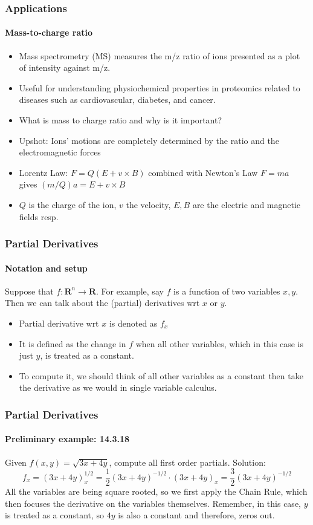 \documentclass[xcolor=svgnames]{beamer}
\begin{document}
\begin{frame}
\frametitle{Applications}
\framesubtitle{Mass-to-charge ratio}
\begin{itemize}
\item Mass spectrometry (MS) measures the m/z ratio of ions presented as a plot of intensity against m/z. 
\item Useful for understanding physiochemical properties in proteomics related to diseases such as cardiovascular, diabetes, and cancer. 
\item What is mass to charge ratio and why is it important?
\item Upshot: Ions' motions are completely determined by the ratio and the electromagnetic forces
\item Lorentz Law: $F = Q(E + v \times B)$ combined with Newton's Law $F = ma$ gives $(m/Q)a = E + v \times B$
\item $Q$ is the charge of the ion, $v$ the velocity, $E,B$ are the electric and magnetic fields resp.
\end{itemize}
\end{frame}
\begin{frame}
\frametitle{Partial Derivatives}
\framesubtitle{Notation and setup}
Suppose that $f: \mathbf{R}^n \to \mathbf{R}$. For example, say $f$ is a function of two variables $x,y$. Then we can talk about the (partial) derivatives wrt $x$ or $y$. 

\begin{itemize}
\item Partial derivative wrt $x$ is denoted as $f_x$
\item It is defined as the change in $f$ when all other variables, which in this case is just $y$, is treated as a constant. 
\item To compute it, we should think of all other variables as a constant then take the derivative as we would in single variable calculus. 

\end{itemize}


\end{frame}
\begin{frame}
\frametitle{Partial Derivatives}
\framesubtitle{Preliminary example: 14.3.18}
Given $f(x,y) = \sqrt{3x + 4y}$, compute all first order partials. 
Solution: 
\[
f_x = (3x + 4y)^{1/2} _ x = \frac{1}{2} (3x + 4y)^{-1/2} \cdot (3x + 4y) _x = \frac{3}{2} (3x + 4y)^{-1/2}
\]
All the variables are being square rooted, so we first apply the Chain Rule, which then focuses the derivative on the variables themselves. Remember, in this case, $y$ is treated as a constant, so $4y$ is also a constant and therefore, zeros out. 
\end{frame}
\end{document}
